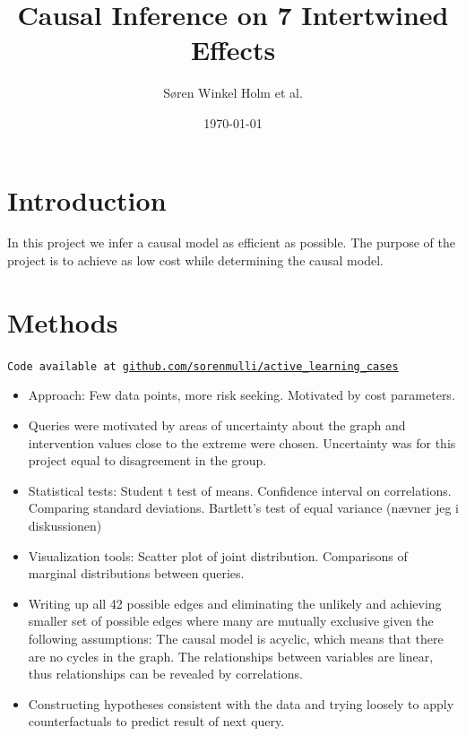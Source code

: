 \documentclass[12pt,fleqn,]{article}
\title{Causal Inference on 7 Intertwined Effects }
\author{Søren Winkel Holm et al.}
\date{\today}
\begin{document}
\maketitle

\begin{abstract}

\end{abstract}

\begin{multicols}{2}
	
	
\section{Introduction} 

In this project we infer a causal model as efficient as possible. The purpose of the project is to achieve as low cost while determining the causal model. 

\section{Methods}
\texttt{Code available at \url{github.com/sorenmulli/active_learning_cases}} \newline
\begin{itemize}[noitemsep]
	\item Approach: Few data points, more risk seeking. Motivated by cost parameters.
	\item Queries were motivated by areas of uncertainty about the graph and intervention values close to the extreme were chosen. Uncertainty was for this project equal to disagreement in the group.
	\item Statistical tests: Student t test of means. Confidence interval on correlations. Comparing standard deviations. Bartlett's test of equal variance (nævner jeg i diskussionen)
	\item Visualization tools: Scatter plot of joint distribution. Comparisons of marginal distributions between queries.
	\item Writing up all 42 possible edges and eliminating the unlikely and achieving smaller set of possible edges where many are mutually exclusive given the following assumptions: The causal model is acyclic, which means that there are no cycles in the graph. The relationships between variables are linear, thus relationships can be revealed by correlations.
	\item Constructing hypotheses consistent with the data and trying loosely to apply counterfactuals to predict result of next query.
\end{itemize}


\end{multicols}
\end{document}
